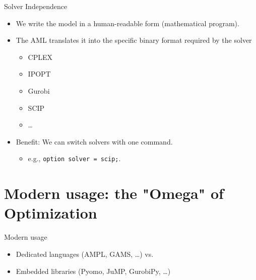 \documentclass[presentation, aspectratio=169]{beamer}
\begin{document}
\begin{frame}[label={sec:org16e3c1c},fragile]{Solver Independence}
 \begin{itemize}
\item We write the model in a human-readable form (mathematical program).
\item The AML translates it into the specific binary format required by the solver
\begin{itemize}
\item CPLEX
\item IPOPT
\item Gurobi
\item SCIP
\item \ldots{}
\end{itemize}
\item \alert{Benefit}: We can switch solvers with one command.
\begin{itemize}
\item e.g., \texttt{option solver = scip;}.
\end{itemize}
\end{itemize}
\end{frame}



\section{Modern usage: the "Omega" of Optimization}
\label{sec:orgbd87158}
\begin{frame}[label={sec:orgda30cb3}]{Modern usage}
\begin{itemize}
\item Dedicated languages (AMPL, GAMS, \ldots{}) vs.
\item Embedded libraries (Pyomo, JuMP, GurobiPy, \ldots{})
\end{itemize}
\end{frame}
\end{document}
